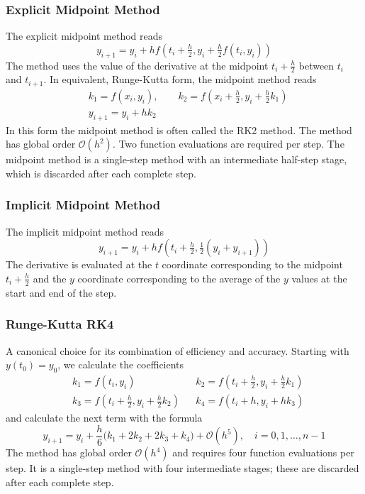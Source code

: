\documentclass[11pt, a4paper]{article}
\renewcommand{\O}{\mathcal{O}}  %
\begin{document}
\subsubsection{Explicit Midpoint Method}
The explicit midpoint method reads
\begin{equation*}
	y_{i+1} = y_{i} + h f\left(t_{i} + \tfrac{h}{2}, y_{i} + \tfrac{h}{2}f(t_{i}, y_{i})\right)
\end{equation*}
The method uses the value of the derivative at the midpoint $ t_{i} + \frac{h}{2} $ between $ t_{i} $ and $ t_{i+1} $. In equivalent, Runge-Kutta form, the midpoint method reads
\begin{align*}
	&k_{1} = f(x_{i}, y_{i}), \qquad k_{2} = f\left(x_{i} + \tfrac{h}{2}, y_{i} + \tfrac{h}{2}k_{1}\right)\\
	&y_{i+1} = y_{i} + hk_{2}
\end{align*}
In this form the midpoint method is often called the RK2 method. The method has global order $ \O(h^{2}) $. Two function evaluations are required per step. The midpoint method is a single-step method with an intermediate half-step stage, which is discarded after each complete step.

\subsubsection{Implicit Midpoint Method}
The implicit midpoint method reads
\begin{equation*}
	y_{i+1} = y_{i} + h f\left(t_{i} + \tfrac{h}{2}, \tfrac{1}{2}(y_{i} + y_{i+1})\right)
\end{equation*}
The derivative is evaluated at the $ t $ coordinate corresponding to the midpoint $ t_{i} + \frac{h}{2} $ and the $ y $ coordinate corresponding to the average of the $ y $ values at the start and end of the step.


\subsubsection{Runge-Kutta RK4}
A canonical choice for its combination of efficiency and accuracy. Starting with $ y(t_{0}) = y_{0}$, we calculate the coefficients 
\begin{align*}
 & k_{1} = f(t_{i}, y_{i}) && k_{2} = f\left (t_{i} + \tfrac{h}{2}, y_{i} + \tfrac{h}{2}k_{1}\right ) \\
 & k_{3} = f\left (t_{i} + \tfrac{h}{2}, y_{i} + \tfrac{h}{2}k_{2} \right ) && k_{4} = f(t_{i} + h, y_{i} + hk_{3})
\end{align*}
and calculate the next term with the formula
\begin{equation*}
	y_{i+1} = y_{i} + \frac{h}{6}\big(k_{1} + 2k_{2} + 2k_{3} + k_{4}\big) + \mathcal{O}(h^{5}), \quad i = 0, 1, \ldots, n - 1
\end{equation*}
The method has global order $ \O(h^{4}) $ and requires four function evaluations per step. It is a single-step method with four intermediate stages; these are discarded after each complete step. 
\end{document}
